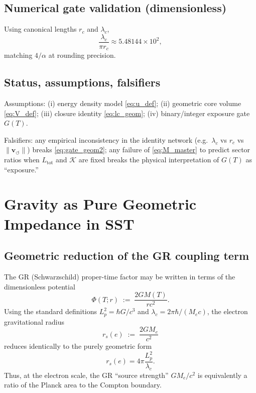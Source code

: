 \documentclass[11pt, a4paper]{article}
\newcommand{\vswirl}{\mathbf{v}_{\!\boldsymbol{\circlearrowleft}}}
\newcommand{\rc}{r_c}
\newcommand{\Ltot}{L_{\text{tot}}}
\newcommand{\alphafs}{\alpha}
\begin{document}
        \subsection{Numerical gate validation (dimensionless)}
        Using canonical lengths $\rc$ and $\lambda_c$,
        \begin{equation}
            \frac{\lambda_c}{\pi \rc}\approx 5.48144\times 10^2,
        \end{equation}
        matching $4/\alphafs$ at rounding precision.
        
        \subsection{Status, assumptions, falsifiers}
        Assumptions: (i) energy density model \eqref{eq:u_def}; (ii) geometric core volume \eqref{eq:V_def};
        (iii) closure identity \eqref{eq:lc_geom}; (iv) binary/integer exposure gate $G(T)$.
        
        Falsifiers: any empirical inconsistency in the identity network (e.g.\ $\lambda_c$ vs $\rc$ vs $\lVert \vswirl \rVert$) breaks \eqref{eq:gate_geom2};
        any failure of \eqref{eq:M_master} to predict sector ratios when $\Ltot$ and $\mathcal{K}$ are fixed breaks the physical interpretation of $G(T)$ as ``exposure.''

        \section{Gravity as Pure Geometric Impedance in SST}
        \label{sec:gravity_impedance}
        
        \subsection{Geometric reduction of the GR coupling term}
            The GR (Schwarzschild) proper-time factor may be written in terms of the dimensionless potential
            \begin{equation}
                \Phi(T;r) \;:=\; \frac{2G M(T)}{r c^2}.
            \end{equation}
            Using the standard definitions $L_p^2=\hbar G/c^3$ and $\lambda_c=2\pi\hbar/(M_e c)$, the electron gravitational radius
            \begin{equation}
                r_s(e) \;:=\; \frac{2G M_e}{c^2}
            \end{equation}
            reduces identically to the purely geometric form
            \begin{equation}
                \boxed{
                    r_s(e) = 4\pi \frac{L_p^2}{\lambda_c}.
                }
            \end{equation}
            Thus, at the electron scale, the GR ``source strength'' $GM_e/c^2$ is equivalently a ratio of the Planck area to the Compton boundary.
        
\end{document}
